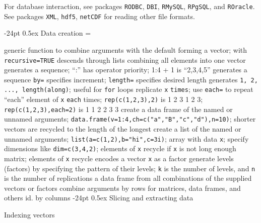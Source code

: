 \documentclass[10pt,landscape]{article}
\makeatletter
\renewcommand\section{\@startsection{section}{1}{0mm}%
                                     {-24pt}%
                                     {0.5ex}%
                                {\color{blue}\normalfont\large\bfseries}}
\newcommand{\code}{\texttt}
\makeatother
\begin{document}
\begin{multicols*}{3}
For database interaction, see packages \code{RODBC}, \code{DBI},
\code{RMySQL}, \code{RPgSQL}, and \code{ROracle}. See packages \code{XML}, \code{hdf5}, \code{netCDF} for reading
other file formats.

\section{Data creation}
\everypar={\hangindent=9mm}

 generic function to combine arguments with the default forming a vector; with \code{recursive=TRUE}	{descends through lists combining all elements into one vector}
	{generates a sequence; ``:'' has operator priority; 1:4 + 1 is ``2,3,4,5''}
 generates a sequence \code{by=} specifies increment; \code{length=}	{specifies desired length}
 generates \code{1, 2, ..., length(along)}; useful for \code{for}	{loops}
 replicate \code{x} \code{times}; use \code{each=} to repeat ``each'' element of \code{x} \code{each} times; \code{rep(c(1,2,3),2)} is 1 2 3 1 2 3; \code{rep(c(1,2,3),each=2)}	{is 1 1 2 2 3 3}
	{create a data frame of the named or unnamed arguments; \code{data.frame(v=1:4,ch=c("a","B","c","d"),n=10)}; shorter vectors are recycled to the length of the longest}
	{create a list of the named or unnamed arguments; \code{list(a=c(1,2),b="hi",c=3i)};}
 array with data \code{x}; specify dimensions like \code{dim=c(3,4,2)}; elements of \code{x} recycle if \code{x}	{is not long enough}
 matrix; elements of \code{x}	{recycle}
 encodes a vector \code{x}	{as a factor}
 generate levels (factors) by specifying the pattern of their levels; \code{k} is the number of levels, and \code{n}	{is the number of replications}
	{a data frame from all combinations of the supplied vectors or factors}
	{combine arguments by rows for matrices, data frames, and others}
	{id. by columns}
\section{Slicing and extracting data}

Indexing vectors


\end{multicols*}
\end{document}
